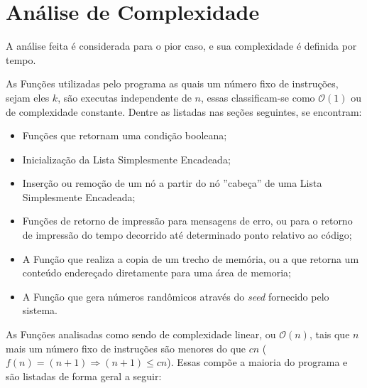 \documentclass[12pt,a4paper]{article}
\numberwithin{figure}{section}
\numberwithin{table}{section}
\begin{document}
\section{Análise de Complexidade}

A análise feita é considerada para o pior caso, e sua complexidade é definida por tempo.

As Funções utilizadas pelo programa as quais um número fixo de instruções, sejam eles $k$, são executas independente de $n$, essas classificam-se como $\mathcal{O}(1)$ ou de complexidade constante. Dentre as listadas nas seções seguintes, se encontram:

\begin{itemize}
	\setlength\itemsep{1pt}
	\item Funções que retornam uma condição booleana; 
	\item Inicialização da Lista Simplesmente Encadeada;
	\item Inserção ou remoção de um nó a partir do nó ''cabeça'' de uma Lista Simplesmente Encadeada;
	\item Funções de retorno de impressão para mensagens de erro, ou para o retorno de impressão do tempo decorrido até determinado ponto relativo ao código;
	\item A Função que realiza a copia de um trecho de memória, ou a que retorna um conteúdo endereçado diretamente para uma área de memoria;
	\item A Função que gera números randômicos através do \textit{seed} fornecido pelo sistema.
\end{itemize}

As Funções analisadas como sendo de complexidade linear, ou $\mathcal{O}(n)$, tais que $n$ mais um número fixo de instruções são menores do que $cn$ ($f(n) = (n+1) \Rightarrow (n+1) \leqslant cn$). Essas compõe a maioria do programa e são listadas de forma geral a seguir:
\end{document}

